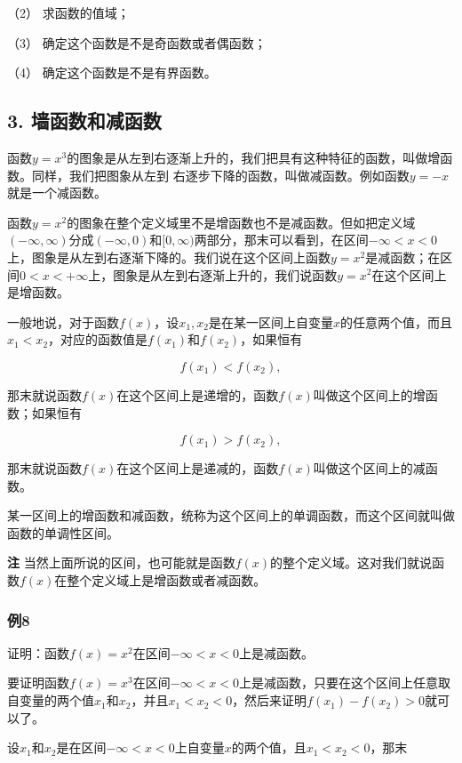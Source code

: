 （2） 求函数的值域；

（3） 确定这个函数是不是奇函数或者偶函数；

（4） 确定这个函数是不是有界函数。

\subsection{3. 墙函数和减函数}

函数\(y = x^3\)的图象是从左到右逐渐上升的，我们把具有这种特征的函数，叫做增函数。同样，我们把图象从左到
右逐步下降的函数，叫做减函数。例如函数\(y = -x\)就是一个减函数。

函数\(y = x^2\)的图象在整个定义域里不是增函数也不是减函数。但如把定义域\((- \infty, \infty)\)分成\((- \infty, 0)\)和\([0, \infty)\)两部分，那末可以看到，在区间\(-\infty < x < 0\)上，图象是从左到右逐渐下降的。我们说在这个区间上函数\(y=x^2\)是减函数；在区间\(0<x<+\infty\)上，图象是从左到右逐渐上升的，我们说函数\(y=x^2\)在这个区间上是增函数。

一般地说，对于函数\(f(x)\)，设\(x_{1}, x_{2}\)是在某一区间上自变量\(x\)的任意两个值，而且\(x_{1} < x_{2}\)，对应的函数值是\(f(x_{1})\)和\(f(x_{2})\)，如果恒有

\[
f (x_{1}) < f (x_{2}), \tag {1}
\]

那末就说函数\(f(x)\)在这个区间上是递增的，函数\(f(x)\)叫做这个区间上的增函数；如果恒有

\[
f (x_{1}) > f (x_{2}), \tag {2}
\]

那末就说函数\(f(x)\)在这个区间上是递减的，函数\(f(x)\)叫做这个区间上的减函数。

某一区间上的增函数和减函数，统称为这个区间上的单调函数，而这个区间就叫做函数的单调性区间。

\textbf{注}
当然上面所说的区间，也可能就是函数\(f(x)\)的整个定义域。这对我们就说函数\(f(x)\)在整个定义域上是增函数或者减函数。

\subsubsection{例8}

证明：函数\(f(x)=x^{2}\)在区间\(-\infty<x<0\)上是减函数。

要证明函数\(f(x) = x^3\)在区间\(-\infty < x < 0\)上是减函数，只要在这个区间上任意取自变量的两个值\(x_1\)和\(x_2\)，并且\(x_1 < x_2 < 0\)，然后来证明\(f(x_1) - f(x_2) > 0\)就可以了。

设\(x_{1}\)和\(x_{2}\)是在区间\(-\infty < x < 0\)上自变量\(x\)的两个值，且\(x_{1} < x_{2} < 0\)，那末

